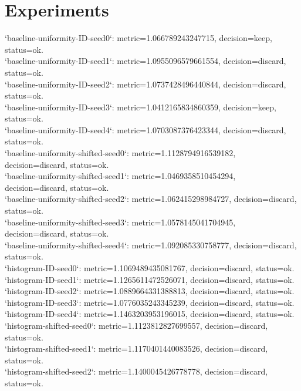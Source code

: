 \documentclass{article}
\begin{document}
\section{Experiments}
\noindent `baseline-uniformity-ID-seed0`: metric=1.066789243247715, decision=keep, status=ok.\\
\noindent `baseline-uniformity-ID-seed1`: metric=1.0955096579661554, decision=discard, status=ok.\\
\noindent `baseline-uniformity-ID-seed2`: metric=1.0737428496440844, decision=discard, status=ok.\\
\noindent `baseline-uniformity-ID-seed3`: metric=1.0412165834860359, decision=keep, status=ok.\\
\noindent `baseline-uniformity-ID-seed4`: metric=1.0703087376423344, decision=discard, status=ok.\\
\noindent `baseline-uniformity-shifted-seed0`: metric=1.1128794916539182, decision=discard, status=ok.\\
\noindent `baseline-uniformity-shifted-seed1`: metric=1.0469358510454294, decision=discard, status=ok.\\
\noindent `baseline-uniformity-shifted-seed2`: metric=1.062415298984727, decision=discard, status=ok.\\
\noindent `baseline-uniformity-shifted-seed3`: metric=1.0578145041704945, decision=discard, status=ok.\\
\noindent `baseline-uniformity-shifted-seed4`: metric=1.092085330758777, decision=discard, status=ok.\\
\noindent `histogram-ID-seed0`: metric=1.1069489435081767, decision=discard, status=ok.\\
\noindent `histogram-ID-seed1`: metric=1.1265611472526071, decision=discard, status=ok.\\
\noindent `histogram-ID-seed2`: metric=1.0889664331388813, decision=discard, status=ok.\\
\noindent `histogram-ID-seed3`: metric=1.0776035243345239, decision=discard, status=ok.\\
\noindent `histogram-ID-seed4`: metric=1.1463203953196015, decision=discard, status=ok.\\
\noindent `histogram-shifted-seed0`: metric=1.1123812827699557, decision=discard, status=ok.\\
\noindent `histogram-shifted-seed1`: metric=1.1170401440083526, decision=discard, status=ok.\\
\noindent `histogram-shifted-seed2`: metric=1.1400045426778778, decision=discard, status=ok.\\
\end{document}
